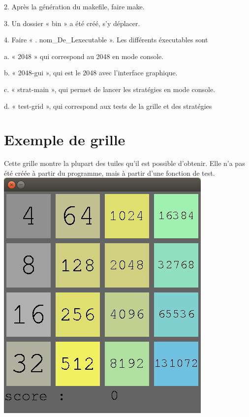 \documentclass[12pt]{report}
\begin{document}
2. Après la génération du makefile, faire make.

3. Un dossier « bin » a été créé, s’y déplacer.

4. Faire « .\/ nom\_De\_Lexecutable ». Les différents éxecutables sont

a. « 2048 » qui correspond au 2048 en mode console.

b. « 2048-gui », qui est le 2048 avec l’interface graphique.

c. « strat-main », qui permet de lancer les stratégies en mode console.

d. « test-grid », qui correspond aux tests de la grille et des stratégies
\section{Exemple de grille}
Cette grille montre la plupart des tuiles qu’il est possible d’obtenir. Elle n’a pas été créée à partir du programme, mais à partir d’une fonction de test.
\includegraphics[scale = 0.5]{2048.png}
\end{document}

